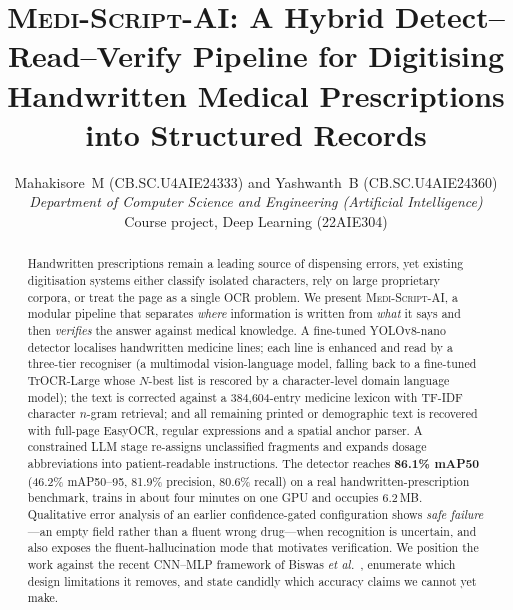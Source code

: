 \documentclass[journal]{IEEEtran}
\newcommand{\sys}{\textsc{Medi-Script-AI}}
\begin{document}
\title{\sys: A Hybrid Detect--Read--Verify Pipeline for Digitising Handwritten Medical Prescriptions into Structured Records}

\author{Mahakisore~M (CB.SC.U4AIE24333) and Yashwanth~B (CB.SC.U4AIE24360)\\
\textit{Department of Computer Science and Engineering (Artificial Intelligence)}\\
Course project, Deep Learning (22AIE304)}

\maketitle

\begin{abstract}
Handwritten prescriptions remain a leading source of dispensing errors, yet existing digitisation systems either classify isolated characters, rely on large proprietary corpora, or treat the page as a single OCR problem. We present \sys, a modular pipeline that separates \emph{where} information is written from \emph{what} it says and then \emph{verifies} the answer against medical knowledge. A fine-tuned YOLOv8-nano detector localises handwritten medicine lines; each line is enhanced and read by a three-tier recogniser (a multimodal vision-language model, falling back to a fine-tuned TrOCR-Large whose $N$-best list is rescored by a character-level domain language model); the text is corrected against a 384{,}604-entry medicine lexicon with TF-IDF character $n$-gram retrieval; and all remaining printed or demographic text is recovered with full-page EasyOCR, regular expressions and a spatial anchor parser. A constrained LLM stage re-assigns unclassified fragments and expands dosage abbreviations into patient-readable instructions. The detector reaches \textbf{86.1\% mAP50} (46.2\% mAP50--95, 81.9\% precision, 80.6\% recall) on a real handwritten-prescription benchmark, trains in about four minutes on one GPU and occupies 6.2\,MB. Qualitative error analysis of an earlier confidence-gated configuration shows \emph{safe failure}---an empty field rather than a fluent wrong drug---when recognition is uncertain, and also exposes the fluent-hallucination mode that motivates verification. We position the work against the recent CNN--MLP framework of Biswas \emph{et al.}~\cite{biswas2026novel}, enumerate which design limitations it removes, and state candidly which accuracy claims we cannot yet make.
\end{abstract}
\end{document}
